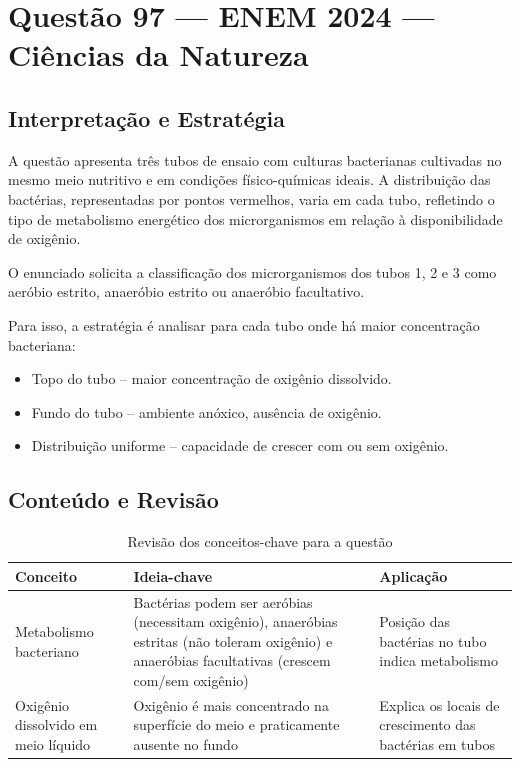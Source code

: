 \documentclass{article}
\begin{document}
\section*{Questão 97 — ENEM 2024 — Ciências da Natureza}

\subsection*{Interpretação e Estratégia}
A questão apresenta três tubos de ensaio com culturas bacterianas cultivadas no mesmo meio nutritivo e em condições físico-químicas ideais. A distribuição das bactérias, representadas por pontos vermelhos, varia em cada tubo, refletindo o tipo de metabolismo energético dos microrganismos em relação à disponibilidade de oxigênio.

O enunciado solicita a classificação dos microrganismos dos tubos 1, 2 e 3 como aeróbio estrito, anaeróbio estrito ou anaeróbio facultativo.

Para isso, a estratégia é analisar para cada tubo onde há maior concentração bacteriana:
\begin{itemize}
  \item Topo do tubo – maior concentração de oxigênio dissolvido.
  \item Fundo do tubo – ambiente anóxico, ausência de oxigênio.
  \item Distribuição uniforme – capacidade de crescer com ou sem oxigênio.
\end{itemize}

\subsection*{Conteúdo e Revisão}
\begin{table}[h!]
  \centering
  \begin{tabular}{|p{5cm}|p{5cm}|p{5cm}|}
    \hline
    Conceito & Ideia-chave & Aplicação \\
    \hline
    Metabolismo bacteriano & Bactérias podem ser aeróbias (necessitam oxigênio), anaeróbias estritas (não toleram oxigênio) e anaeróbias facultativas (crescem com/sem oxigênio) & Posição das bactérias no tubo indica metabolismo \\
    \hline
    Oxigênio dissolvido em meio líquido & Oxigênio é mais concentrado na superfície do meio e praticamente ausente no fundo & Explica os locais de crescimento das bactérias em tubos \\
    \hline
  \end{tabular}
  \caption{Revisão dos conceitos-chave para a questão}
\end{table}
\end{document}
